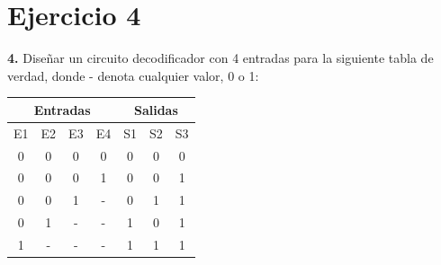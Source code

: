 \chapter*{Ejercicio 4}

\textbf{4.}  Diseñar un circuito decodificador con 4 entradas para la siguiente tabla de verdad, donde - denota cualquier valor, 0 o 1:

\begin{center}
        \begin{tabular}{|c c c c|c c c|}
        \hline
        \multicolumn{4}{|c|}{Entradas} &
        \multicolumn{3}{|c|}{Salidas} \\ \hline
        E1 & E2 & E3 & E4 & S1 & S2 & S3 \\ \hline
        0 & 0 & 0 & 0 & 0 & 0 & 0 \\ \hline
        0 & 0 & 0 & 1 & 0 & 0 & 1 \\ \hline
        0 & 0 & 1 & - & 0 & 1 & 1 \\ \hline
        0 & 1 & - & - & 1 & 0 & 1 \\ \hline
        1 & - & - & - & 1 & 1 & 1 \\ \hline
        \end{tabular}
        \label{tab:coches}
\end{center}


